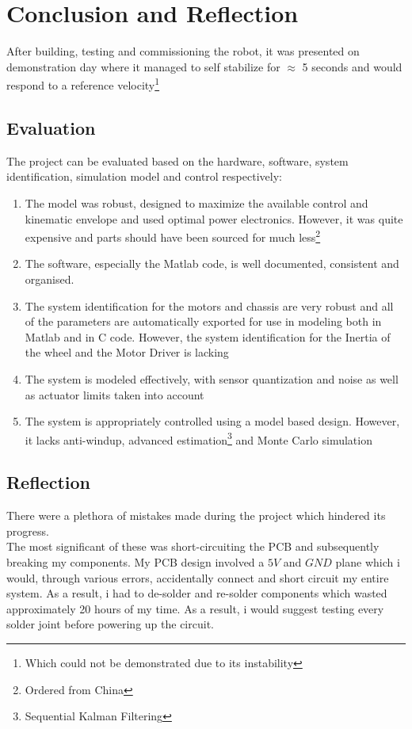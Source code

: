 \documentclass{UoNMCHA}
\numberwithin{equation}{section}
\begin{document}
\newpage
\section{Conclusion and Reflection}\label{Conclusion}

After building, testing and commissioning the robot, it was presented on demonstration day where it managed to self stabilize for $\approx$ 5 seconds and would respond to a reference velocity\footnote{Which could not be demonstrated due to its instability}

\subsection{Evaluation}

The project can be evaluated based on the hardware, software, system identification, simulation model and control respectively:


\begin{enumerate}

	\item The model was robust, designed to maximize the available control and kinematic envelope and used optimal power electronics. However, it was quite expensive and parts should have been sourced for much less\footnote{Ordered from China}
	\item The software, especially the Matlab code, is well documented, consistent  and organised. 
	\item The system identification for the motors and chassis are very robust and all of the parameters are automatically exported for use in modeling both in Matlab and in C code. However, the system identification for the Inertia of the wheel and the Motor Driver is lacking
	\item The system is modeled effectively, with sensor quantization and noise as well as actuator limits taken into account 
	\item The system is appropriately controlled using a model based design. However, it lacks anti-windup, advanced estimation\footnote{Sequential Kalman Filtering} and Monte Carlo simulation
\end{enumerate}

\subsection{Reflection}

There were a plethora of mistakes made during the project which hindered its progress. \\ The most significant of these was short-circuiting the PCB and subsequently breaking my components. My PCB design involved a $5V$ and $GND$ plane which i would, through various errors, accidentally connect and short circuit my entire system. As a result, i had to de-solder and re-solder components which wasted approximately 20 hours of my time. As a result, i would suggest testing every solder joint before powering up the circuit. \\
\end{document}
